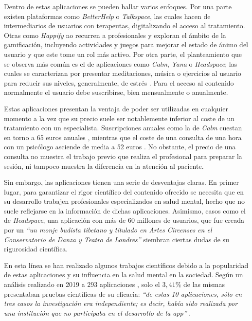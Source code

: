         Dentro de estas aplicaciones se pueden hallar varios enfoques. Por una parte existen plataformas como \textit{BetterHelp} o \textit{Talkspace}, las cuales hacen de intermediarios de usuarios con terapeutas, digitalizando el acceso al tratamiento. Otras como \textit{Happify} no recurren a profesionales y exploran el ámbito de la gamificación, incluyendo actividades y juegos para mejorar el estado de ánimo del usuario y que este tome un rol más activo.  Por otra parte, el planteamiento que se observa más común es el de aplicaciones como \textit{Calm}, \textit{Yana} o \textit{Headspace}; las cuales se caracterizan por presentar meditaciones, música o ejercicios al usuario para reducir sus niveles, generalmente, de estrés \cite{modglin_5_2023} \cite{pepinosa_cinco_2023}. Para el acceso al contenido normalmente el usuario debe suscribirse, bien mensualmente o anualmente. 

        Estas aplicaciones presentan la ventaja de poder ser utilizadas en cualquier momento a la vez que su precio suele ser notablemente inferior al coste de un tratamiento con un especialista. Suscripciones anuales como la de \textit{Calm} cuestan en torno a 65 euros anuales \cite{modglin_5_2023}, mientras que el coste de una consulta de una hora con un psicólogo asciende de media a 52 euros \cite{garcia_santos_boom_2023}. No obstante, el precio de una consulta no muestra el trabajo previo que realiza el profesional para preparar la sesión, ni tampoco muestra la diferencia en la atención al paciente.

        Sin embargo, las aplicaciones tienen una serie de desventajas claras. En primer lugar, para garantizar el rigor científico del contenido ofrecido se necesita que en su desarrollo trabajen profesionales especializados en salud mental, hecho que no suele reflejarse en la información de dichas aplicaciones. Asimismo, casos como el de \textit{Headspace}, una aplicación con más de $60$ millones de usuarios, que fue creada por un \textit{``un monje budista tibetano y titulado en Artes Circenses en el Conservatorio de Danza y Teatro de Londres''} \cite{garcia_santos_boom_2023} siembran ciertas dudas de su rigurosidad científica.
        
        En esta línea se han realizado algunos trabajos científicos debido a la popularidad de estas aplicaciones y su influencia en la salud mental en la sociedad. Según un análisis realizado en 2019 a $293$ aplicaciones \cite{marshall_digital_2019}, solo el $3,41\%$ de las mismas presentaban pruebas científicas de su eficacia: \textit{``de estas 10 aplicaciones, sólo en tres casos la investigación era independiente; es decir, había sido realizada por una institución que no participaba en el desarrollo de la app''} \cite{garcia_santos_boom_2023}.

